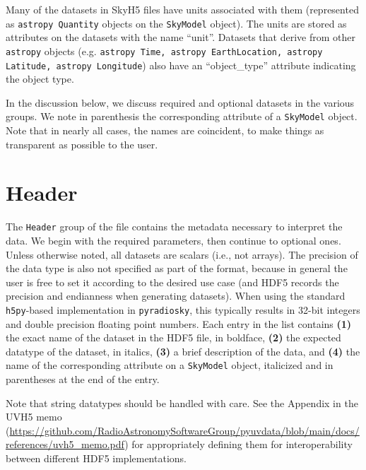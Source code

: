 \documentclass[11pt, oneside]{article}
\begin{document}
Many of the datasets in SkyH5 files have units associated with them (represented
as \texttt{astropy Quantity} objects on the \texttt{SkyModel} object).
The units are stored as attributes on the datasets with the name ``unit''.
Datasets that derive from other \texttt{astropy} objects (e.g. \texttt{astropy Time,
astropy EarthLocation, astropy Latitude, astropy Longitude})
also have an ``object\_type'' attribute indicating the object type.

In the discussion below, we discuss required and optional datasets in the
various groups. We note in parenthesis the corresponding attribute of a \texttt{SkyModel}
object. Note that in nearly all cases, the names are coincident, to make things
as transparent as possible to the user.

\section{Header}
\label{sec:header}
The \texttt{Header} group of the file contains the metadata necessary to interpret
the data. We begin with the required parameters, then continue to optional
ones. Unless otherwise noted, all datasets are scalars (i.e., not arrays). The
precision of the data type is also not specified as part of the format, because
in general the user is free to set it according to the desired use case (and
HDF5 records the precision and endianness when generating datasets). When using
the standard \texttt{h5py}-based implementation in \texttt{pyradiosky}, this typically
results in 32-bit integers and double precision floating point numbers. Each
entry in the list contains \textbf{(1)} the exact name of the dataset in the
HDF5 file, in boldface, \textbf{(2)} the expected datatype of the dataset, in
italics, \textbf{(3)} a brief description of the data, and \textbf{(4)} the name
of the corresponding attribute on a \texttt{SkyModel} object, italicized and in
parentheses at the end of the entry.

Note that string datatypes should be handled with care. See
the Appendix in the UVH5 memo
(\url{https://github.com/RadioAstronomySoftwareGroup/pyuvdata/blob/main/docs/references/uvh5_memo.pdf})
for appropriately defining them for interoperability between different HDF5
implementations.
\end{document}
